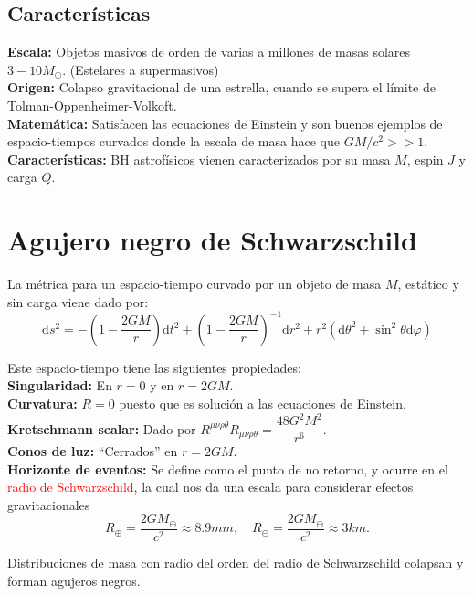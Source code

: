 \documentclass[../main]{subfiles}
\begin{document}
\begin{adjustwidth}{0pt}{-100pt}
\subsection*{Características}
\textbf{Escala:} Objetos masivos de orden de varias a millones de masas solares $3-10 M_{\odot}$. (Estelares a supermasivos)\\
\textbf{Origen:} Colapso gravitacional de una estrella, cuando se supera el límite de Tolman-Oppenheimer-Volkoft.\\
\textbf{Matemática:} Satisfacen las ecuaciones de Einstein y son buenos ejemplos de espacio-tiempos curvados donde la escala de masa hace que $GM/c^2>>1$.\\
\textbf{Características:} BH astrofísicos vienen caracterizados por su masa $M$, espin $J$ y carga $Q$.

\section{Agujero negro de Schwarzschild}\label{part6.1}
La métrica para un espacio-tiempo curvado por un objeto de masa $M$, estático y sin carga viene dado por:
\begin{equation}
    \mathrm{d}s^2=-\left(1-\dfrac{2GM}{r}\right)\mathrm{d}t^2+\left(1-\dfrac{2GM}{r}\right)^{-1}\mathrm{d}r^2+r^2(\mathrm{d}\theta^2+\sin^2 \theta\mathrm{d}\varphi)
\end{equation}

Este espacio-tiempo tiene las siguientes propiedades:\\
\textbf{Singularidad:} En $r=0$ y en $r=2GM$.\\
\textbf{Curvatura:} $R=0$ puesto que es solución a las ecuaciones de Einstein.\\
\textbf{Kretschmann scalar:} Dado por $R^{\mu\nu\rho\theta}R_{\mu\nu\rho\theta}=\dfrac{48G^2M^2}{r^6}$.\\
\textbf{Conos de luz:} ``Cerrados'' en $r=2GM$.\\
\textbf{Horizonte de eventos:} Se define como el punto de no retorno, y ocurre en el \textcolor{red}{radio de Schwarzschild}, la cual nos da una escala para considerar efectos gravitacionales
\begin{equation}
    R_{\oplus}=\dfrac{2GM_{\oplus}}{c^2}\approx 8.9mm,\quad R_{\ominus}=\dfrac{2GM_{\ominus}}{c^2}\approx 3km.
\end{equation}

Distribuciones de masa con radio del orden del radio de Schwarzschild colapsan y forman agujeros negros.


\end{adjustwidth}
\end{document}
